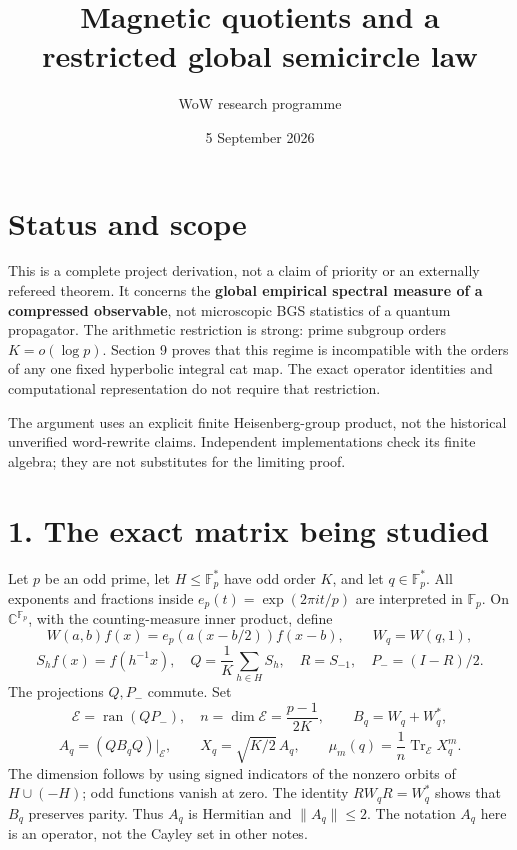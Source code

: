 \documentclass[
  11pt,
]{article}
\title{Magnetic quotients and a restricted global semicircle law}
\author{WoW research programme}
\date{5 September 2026}
\begin{document}
\maketitle

\hypertarget{status-and-scope}{%
\section{Status and scope}\label{status-and-scope}}

This is a complete project derivation, not a claim of priority or an
externally refereed theorem. It concerns the \textbf{global empirical
spectral measure of a compressed observable}, not microscopic BGS
statistics of a quantum propagator. The arithmetic restriction is
strong: prime subgroup orders \(K=o(\log p)\). Section 9 proves that
this regime is incompatible with the orders of any one fixed hyperbolic
integral cat map. The exact operator identities and computational
representation do not require that restriction.

The argument uses an explicit finite Heisenberg-group product, not the
historical unverified word-rewrite claims. Independent implementations
check its finite algebra; they are not substitutes for the limiting
proof.

\hypertarget{the-exact-matrix-being-studied}{%
\section{1. The exact matrix being
studied}\label{the-exact-matrix-being-studied}}

Let \(p\) be an odd prime, let \(H\leq\mathbb F_p^*\) have odd order
\(K\), and let \(q\in\mathbb F_p^*\). All exponents and fractions inside
\(e_p(t)=\exp(2\pi i t/p)\) are interpreted in \(\mathbb F_p\). On
\(\mathbb C^{\mathbb F_p}\), with the counting-measure inner product,
define \[
 W(a,b)f(x)=e_p(a(x-b/2))f(x-b),\qquad W_q=W(q,1),
\] \[
 S_hf(x)=f(h^{-1}x),\quad Q=\frac1K\sum_{h\in H}S_h,\quad
 R=S_{-1},\quad P_-=(I-R)/2.
\] The projections \(Q,P_-\) commute. Set \[
 \mathcal E=\operatorname{ran}(QP_-),\quad n=\dim\mathcal E=\frac{p-1}{2K},
 \qquad B_q=W_q+W_q^*,
\] \[
 A_q=(QB_qQ)|_{\mathcal E},\qquad X_q=\sqrt{K/2}\,A_q,
 \qquad \mu_m(q)=\frac1n\operatorname{Tr}_{\mathcal E}X_q^m. \tag{1}
\] The dimension follows by using signed indicators of the nonzero
orbits of \(H\cup(-H)\); odd functions vanish at zero. The identity
\(RW_qR=W_q^*\) shows that \(B_q\) preserves parity. Thus \(A_q\) is
Hermitian and \(\|A_q\|\leq2\). The notation \(A_q\) here is an
operator, not the Cayley set in other notes.
\end{document}

